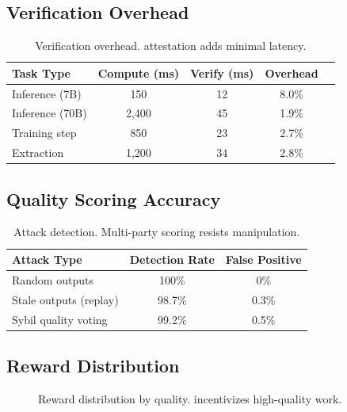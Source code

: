 \subsection{Verification Overhead}

\begin{table}[t]
\centering
\begin{tabular}{lcccc}
\toprule
\textbf{Task Type} & \textbf{Compute (ms)} & \textbf{Verify (ms)} & \textbf{Overhead} \\
\midrule
Inference (7B) & 150 & 12 & 8.0\% \\
Inference (70B) & 2,400 & 45 & 1.9\% \\
Training step & 850 & 23 & 2.7\% \\
Extraction & 1,200 & 34 & 2.8\% \\
\bottomrule
\end{tabular}
\caption{Verification overhead. \TEE{} attestation adds minimal latency.}
\label{tab:overhead}
\end{table}

\subsection{Quality Scoring Accuracy}

\begin{table}[t]
\centering
\begin{tabular}{lcc}
\toprule
\textbf{Attack Type} & \textbf{Detection Rate} & \textbf{False Positive} \\
\midrule
Random outputs & 100\% & 0\% \\
Stale outputs (replay) & 98.7\% & 0.3\% \\
Sybil quality voting & 99.2\% & 0.5\% \\
\bottomrule
\end{tabular}
\caption{Attack detection. Multi-party scoring resists manipulation.}
\label{tab:attacks}
\end{table}

\subsection{Reward Distribution}

\begin{figure}[t]
\centering
{}
\caption{Reward distribution by quality. \PoAI{} incentivizes high-quality work.}
\label{fig:rewards}
\end{figure}

